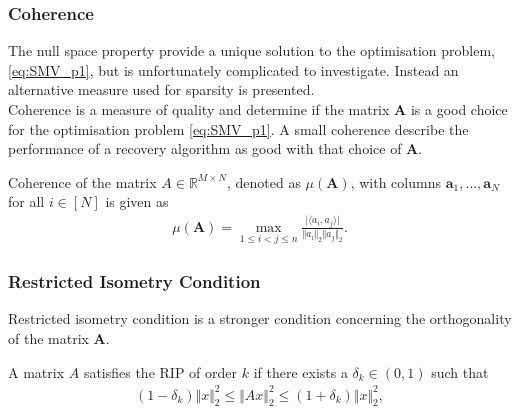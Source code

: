 \subsubsection{Coherence}
The null space property provide a unique solution to the optimisation problem, \eqref{eq:SMV_p1}, but is unfortunately complicated to investigate. Instead an alternative measure used for sparsity is presented.
\\
Coherence is a measure of quality and determine if the matrix $\mathbf{A}$ is a good choice for the optimisation problem \eqref{eq:SMV_p1}. A small coherence describe the performance of a recovery algorithm as good with that choice of $\mathbf{A}$. 
\begin{definition}[Coherence]
Coherence of the matrix $A \in \mathbb{R}^{M \times N}$, denoted as $\mu (\mathbf{A})$, with columns $\mathbf{a}_1, \dots, \mathbf{a}_N$ for all $i \in [N]$ is given as
\begin{align*}
\mu (\mathbf{A}) = \max_{1 \leq i < j \leq n} \frac{\vert \langle a_i, a_j \rangle \vert}{\Vert a_i \Vert_2 \Vert a_j \Vert_2}.
\end{align*}
\end{definition}

\subsubsection{Restricted Isometry Condition}
Restricted isometry condition is a stronger condition concerning the orthogonality of the matrix $\mathbf{A}$.
\begin{definition}
A matrix $A$ satisfies the RIP of order $k$ if there exists a $\delta_k \in (0,1)$ such that
\begin{align*}
(1 - \delta_k) \Vert x \Vert_2^2 \leq \Vert Ax \Vert_2^2 \leq (1 + \delta_k) \Vert x \Vert_2^2,
\end{align*}%
\end{definition}

